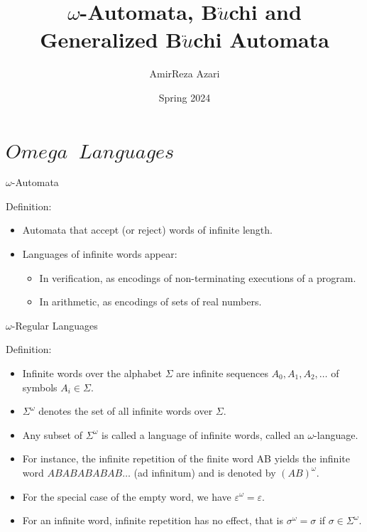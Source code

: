 \documentclass[17pt, t, lualatex]{beamer}
\title{$\omega$-Automata, B$\ddot{u}$chi and Generalized B$\ddot{u}$chi Automata}
\date{Spring 2024}
\institute[SUT]{Sharif University of Technology}
\author{AmirReza Azari}
\begin{document}
\inserttitlepage

\section{$Omega\;\; Languages$}

\insertsectionpage

\begin{frame}{$\omega$-Automata}
\begin{block}{Definition:}
\begin{itemize}
    \item
    Automata that accept (or reject) words of 
infinite length.
    \item 
    Languages of infinite words appear:
    \begin{itemize}
        \item
        In verification, as encodings of non-terminating 
executions of a program.
        \item 
        In arithmetic, as encodings of sets of real 
numbers.
    \end{itemize}
\end{itemize}
\end{block}
\end{frame}

\begin{frame}{$\omega$-Regular Languages}
\begin{block}{Definition:}
\begin{itemize}
    \item Infinite words over the alphabet $\Sigma$ are infinite sequences $A_0, A_1, A_2, \ldots$ of symbols $A_i \in \Sigma$.
    \item $\Sigma^{\omega}$ denotes the set of all infinite words over $\Sigma$.
    \item Any subset of $\Sigma^{\omega}$ is called a language of infinite words, called an $\omega$-language.
    \item For instance, the infinite repetition of the finite word AB yields
    the infinite word $ABABABABAB\ldots$ (ad infinitum) and is denoted by $(AB)^{\omega}$.
    \item For the special case of the empty word, we have $\varepsilon^{\omega} = \varepsilon$. 
    \item 
    For an infinite word, infinite repetition has no effect, that is $\sigma^{\omega} = \sigma$ if $\sigma \in \Sigma^{\omega}$.

\end{itemize}
\end{block}
\end{frame}
\end{document}
